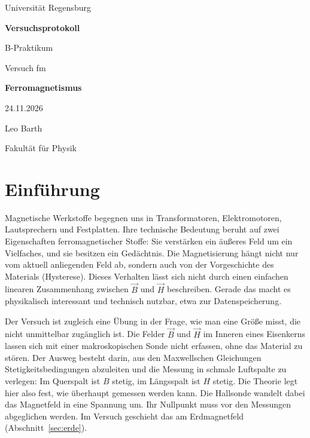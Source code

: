 \documentclass[a4paper,11pt]{article}
\newcommand{\Versuchsdatum}{24.11.2026}
\newcommand{\Autoren}{Leo Barth}
\begin{document}
\begin{titlepage}
  \centering
  \vspace*{2cm}
  {\Large Universität Regensburg\par}
  \vspace{1cm}
  {\huge\bfseries Versuchsprotokoll\par}
  \vspace{0.5cm}
  {\Large B-Praktikum\par}
  {\Large Versuch fm\par}
  \vspace{1.5cm}
  {\Huge\bfseries Ferromagnetismus\par}
  \vspace{1.5cm}
  {\large \Versuchsdatum\par}
  \vspace{1cm}
  {\large \Autoren\par}
  \vfill
  {\large Fakultät für Physik\par}
\end{titlepage}

\tableofcontents
\newpage

\section{Einführung}

Magnetische Werkstoffe begegnen uns in Transformatoren, Elektromotoren,
Lautsprechern und Festplatten. Ihre technische Bedeutung beruht auf zwei
Eigenschaften ferromagnetischer Stoffe: Sie verstärken ein äußeres Feld um ein
Vielfaches, und sie besitzen ein \glqq Gedächtnis\grqq. Die Magnetisierung hängt
nicht nur vom aktuell anliegenden Feld ab, sondern auch von der Vorgeschichte des
Materials (Hysterese). Dieses Verhalten lässt sich nicht durch einen einfachen
linearen Zusammenhang zwischen $\vec B$ und $\vec H$ beschreiben. Gerade das
macht es physikalisch interessant und technisch nutzbar, etwa zur
Datenspeicherung.

Der Versuch ist zugleich eine Übung in der Frage, wie man eine Größe misst, die
nicht unmittelbar zugänglich ist. Die Felder $\vec B$ und $\vec H$ im Inneren
eines Eisenkerns lassen sich mit einer makroskopischen Sonde nicht erfassen,
ohne das Material zu stören. Der Ausweg besteht darin, aus den Maxwellschen
Gleichungen Stetigkeitsbedingungen abzuleiten und die Messung in schmale
Luftspalte zu verlegen: Im Querspalt ist $B$ stetig, im Längsspalt ist $H$
stetig. Die Theorie legt hier also fest, wie überhaupt gemessen werden kann.
Die Hallsonde wandelt dabei das Magnetfeld in eine Spannung um. Ihr Nullpunkt
muss vor den Messungen abgeglichen werden. Im Versuch geschieht das am
Erdmagnetfeld (Abschnitt~\ref{sec:erde}).
\end{document}
